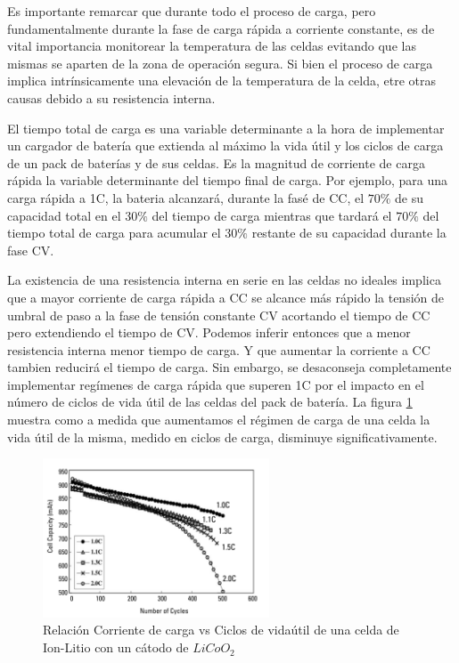 \documentclass[10pt,a4paper]{article}
\begin{document}
Es importante remarcar que durante todo el proceso de carga, pero
fundamentalmente durante la fase de carga rápida a corriente constante, es de
vital importancia monitorear la temperatura de las celdas evitando que las
mismas se aparten de la zona de operación segura. Si bien el proceso de carga
implica intrínsicamente una elevación de la temperatura de la celda, etre otras
causas debido a su resistencia interna.

El tiempo total de carga es una variable determinante a la hora de implementar
un cargador de batería que extienda al máximo la vida útil y los ciclos de carga
de un pack de baterías y de sus celdas. Es la magnitud de corriente de carga
rápida la variable determinante del tiempo final de carga. Por ejemplo, para una
carga rápida a 1C, la bateria alcanzará, durante la fasé de \acrshort{CC}, el
$70\%$ de su capacidad total en el $30\%$ del tiempo de carga mientras que
tardará el $70\%$ del tiempo total de carga para acumular el $30\%$ restante de
su capacidad durante la fase \acrshort{CV}. 

La existencia de una resistencia interna en serie en las celdas no ideales
implica que a mayor corriente de carga rápida a CC se alcance más rápido la
tensión de umbral de paso a la fase de tensión constante CV acortando el tiempo
de CC pero extendiendo el tiempo de CV. Podemos inferir entonces que a menor
resistencia interna menor tiempo de carga. Y que aumentar la corriente a CC
tambien reducirá el tiempo de carga.  Sin embargo, se desaconseja completamente
implementar regímenes de carga rápida que superen 1C por el impacto en el número
de ciclos de vida útil de las celdas del pack de batería. La figura
\ref{fig:C_vs_Cycle_I} muestra como a medida que aumentamos el régimen de carga
de una celda la vida útil de la misma, medido en ciclos de carga, disminuye
significativamente.

\begin{figure}[h!] \centering
    \includegraphics[width=0.6\textwidth]{bat_char/C_vs_Cycle_I.png}
    \caption{Relación Corriente de carga vs Ciclos de vidaútil de una celda de
    Ion-Litio con un cátodo de $LiCoO_2$} \label{fig:C_vs_Cycle_I} 
\end{figure}
\FloatBarrier
\end{document}
